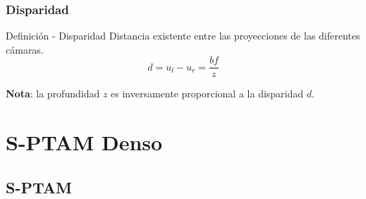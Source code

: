 \documentclass[compress]{beamer}
\begin{document}
\begin{frame}
	\frametitle{Disparidad}

	\begin{block}{Definición - Disparidad}
		Distancia existente entre las proyecciones de las diferentes cámaras.
	\begin{equation}
		d=u_{l}-u_{r}=\frac{bf}{z}
	\end{equation}
	\end{block}

	\textbf{Nota}: la profundidad $z$ es inversamente proporcional a la disparidad $d$.

	\vspace{-1em}
	\begin{figure}[!htb]
		\centering
		\hfill
		\centering
		\hfill
	\end{figure}

\end{frame}


\section{S-PTAM Denso}


\subsection{S-PTAM}
\end{document}
